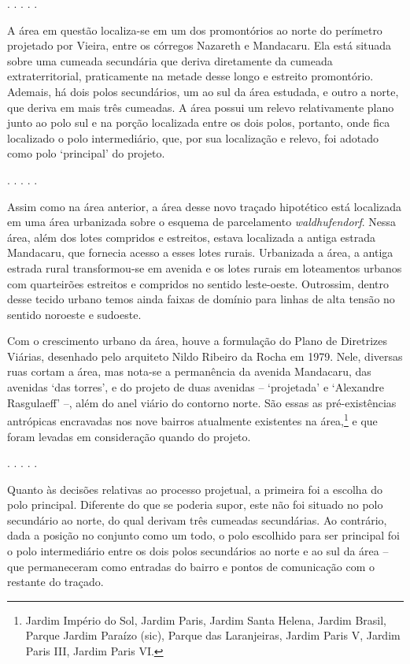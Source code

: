 \documentclass[12pt, a4paper]{book} %
\begin{document}
        \begin{center}
            . . . . .
        \end{center}  
        A área em questão localiza-se em um dos promontórios ao norte do perímetro projetado por Vieira, entre os córregos Nazareth e Mandacaru. Ela está situada sobre uma cumeada secundária que deriva diretamente da cumeada extraterritorial, praticamente na metade desse longo e estreito promontório. Ademais, há dois polos secundários, um ao sul da área estudada, e outro a norte, que deriva em mais três cumeadas. A área possui um relevo relativamente plano junto ao polo sul e na porção localizada entre os dois polos, portanto, onde fica localizado o polo intermediário, que, por sua localização e relevo, foi adotado como polo `principal' do projeto. 

        \begin{center}
            . . . . .
        \end{center} 
        Assim como na área anterior, a área desse novo traçado hipotético está localizada em uma área urbanizada sobre o esquema de parcelamento \textit{waldhufendorf}. Nessa área, além dos lotes compridos e estreitos, estava localizada a antiga estrada Mandacaru, que fornecia acesso a esses lotes rurais. Urbanizada a área, a antiga estrada rural transformou-se em avenida e os lotes rurais em loteamentos urbanos com quarteirões estreitos e compridos no sentido leste-oeste. Outrossim, dentro desse tecido urbano temos ainda faixas de domínio para linhas de alta tensão no sentido noroeste e sudoeste.

        Com o crescimento urbano da área, houve a formulação do Plano de Diretrizes Viárias, desenhado pelo arquiteto Nildo Ribeiro da Rocha em 1979. Nele, diversas ruas cortam a área, mas nota-se a permanência da avenida Mandacaru, das avenidas `das torres', e do projeto de duas avenidas – `projetada' e `Alexandre Rasgulaeff' –, além do anel viário do contorno norte.
        São essas as pré-existências antrópicas encravadas nos nove bairros atualmente existentes na área,\footnote[20]{Jardim Império do Sol, Jardim Paris, Jardim Santa Helena, Jardim Brasil, Parque Jardim Paraízo (sic), Parque das Laranjeiras, Jardim Paris V, Jardim Paris III, Jardim Paris VI.} e que foram levadas em consideração quando do projeto.

        \begin{center}
            . . . . .
        \end{center} 
        Quanto às decisões relativas ao processo projetual, a primeira foi a escolha do polo principal. Diferente do que se poderia supor, este não foi situado no polo secundário ao norte, do qual derivam três cumeadas secundárias. Ao contrário, dada a posição no conjunto como um todo, o polo escolhido para ser principal foi o polo intermediário entre os dois polos secundários ao norte e ao sul da área – que permaneceram como entradas do bairro e pontos de comunicação com o restante do traçado.
        
\end{document}
